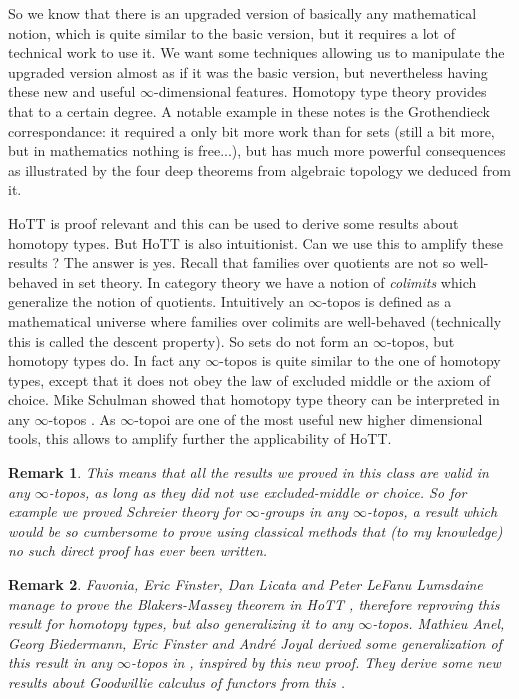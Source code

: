 \documentclass{article}
\newtheorem{remark}{Remark}
\begin{document}
So we know that there is an upgraded version of basically any mathematical notion, which is quite similar to the basic version, but it requires a lot of technical work to use it. We want some techniques allowing us to manipulate the upgraded version almost as if it was the basic version, but nevertheless having these new and useful $\infty$-dimensional features. Homotopy type theory provides that to a certain degree. A notable example in these notes is the Grothendieck correspondance: it required a only bit more work than for sets (still a bit more, but in mathematics nothing is free...), but has much more powerful consequences as illustrated by the four deep theorems from algebraic topology we deduced from it. 

HoTT is proof relevant and this can be used to derive some results about homotopy types. But HoTT is also intuitionist. Can we use this to amplify these results ? The answer is yes. Recall that families over quotients are not so well-behaved in set theory. In category theory we have a notion of \emph{colimits} which generalize the notion of quotients. Intuitively an $\infty$-topos is defined as a mathematical universe where families over colimits are well-behaved (technically this is called the descent property). So sets do not form an $\infty$-topos, but homotopy types do. In fact any $\infty$-topos is quite similar to the one of homotopy types, except that it does not obey the law of excluded middle or the axiom of choice. Mike Schulman showed that homotopy type theory can be interpreted in any $\infty$-topos \cite{shulman2019all}. As $\infty$-topoi are one of the most useful new higher dimensional tools, this allows to amplify further the applicability of HoTT.

\begin{remark}
This means that all the results we proved in this class are valid in any $\infty$-topos, as long as they did not use excluded-middle or choice. So for example we proved Schreier theory for $\infty$-groups in any $\infty$-topos, a result which would be so cumbersome to prove using classical methods that (to my knowledge) no such direct proof has ever been written.
\end{remark}

\begin{remark}
Favonia, Eric Finster, Dan Licata and Peter LeFanu Lumsdaine manage to prove the Blakers-Massey theorem in HoTT \cite{hou2016mechanization}, therefore reproving this result for homotopy types, but also generalizing it to any $\infty$-topos. Mathieu Anel, Georg Biedermann, Eric Finster and Andr{\'e} Joyal derived some generalization of this result in any $\infty$-topos in \cite{anel2017generalized}, inspired by this new proof. They derive some new results about Goodwillie calculus of functors from this \cite{anel2018goodwillie}. 
\end{remark}
\end{document}
